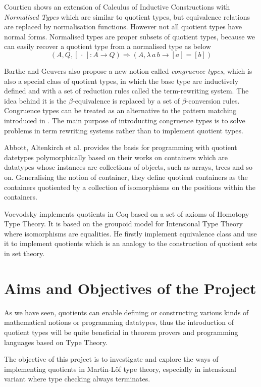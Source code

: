 \documentclass{article}
\theoremstyle{definition}
\newcommand{\dotph}{\,\cdot\,}
\providecommand{\class}[1]{[#1]}
\newcommand{\itt}{Intensional Type Theory}
\newcommand{\mltt}{Martin-L\"{o}f type theory}
\begin{document}
Courtieu \cite{cou:01} shows an extension of Calculus of Inductive Constructions
with \emph{Normalised Types} which are similar to quotient types, but equivalence relations are replaced by normalisation functions. 
However not all quotient types have normal forms. Normalised types are
proper subsets of quotient types, because we can easily recover a quotient
type from a normalised type as below
\[ (A, Q, \class\dotph \colon A \to Q) \Rightarrow(A, \lambda \,a \,b\to \class a = \class b)\]


Barthe and Geuvers \cite{bar:96} also propose a new notion called
\emph{congruence types}, which is also a special class of quotient
types, in which the base type are inductively defined and with a set
of reduction rules called the term-rewriting system. The idea behind
it is the $\beta$-equivalence is replaced by a set of
$\beta$-conversion rules. Congruence types can be treated as an
alternative to the pattern matching introduced in \cite{coq:92}. The main
purpose of introducting congruence types is to solve problems in
term rewriting systems rather than to implement quotient types.


Abbott, Altenkirch et al. \cite{abb:04} provides the basis for
programming with quotient datetypes polymorphically based on their
works on containers which are datatypes whose instances are
collections of objects, such as arrays, trees and so on. Generalising
the notion of container, they define quotient containers as the
containers quotiented by a collection of isomorphisms on the positions
within the containers.

Voevodsky \cite{voe:hset} implements quotients in Coq based on a set
of axioms of Homotopy Type Theory. It is based on the groupoid model
for \itt{} where isomorphisms are equalities. He firstly implement
equivalence class and use it to implement quotients which is an
analogy to the construction of quotient sets in set theory. 

\section{Aims and Objectives of the Project}
\label{sec:ob}

As we have seen, quotients can enable defining or constructing various kinds of
mathematical notions or programming datatypes, thus the introduction of
quotient types will be quite beneficial in theorem provers and
programming languages based on Type Theory. 

The objective of this project is to investigate and explore the ways of
implementing quotients in \mltt{}, especially in intensional
variant where type checking always terminates.
\end{document}
